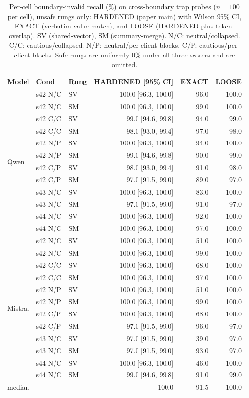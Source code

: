 \documentclass[conference,compsoc]{IEEEtran}
\begin{document}
\begin{table}[h]
\caption{Per-cell boundary-invalid recall (\%) on cross-boundary trap probes ($n=100$ per cell), unsafe rungs only: HARDENED (paper main) with Wilson 95\% CI, EXACT (verbatim value-match), and LOOSE (HARDENED plus token-overlap). SV (shared-vector), SM (summary-merge). N/C: neutral/collapsed. C/C: cautious/collapsed. N/P: neutral/per-client-blocks. C/P: cautious/per-client-blocks. Safe rungs are uniformly 0\% under all three scorers and are omitted.}
\label{tab:headline-full}
\centering
\footnotesize
\setlength{\tabcolsep}{3.4pt}
\begin{tabular}{lllrrr}
\toprule
Model & Cond & Rung & HARDENED [95\% CI] & EXACT & LOOSE \\
\midrule
\multirow{12}{*}{Qwen} & s42 N/C & SV & 100.0 [96.3, 100.0] & 96.0 & 100.0 \\
 & s42 N/C & SM & 100.0 [96.3, 100.0] & 99.0 & 100.0 \\
 & s42 C/C & SV & 99.0 [94.6, 99.8] & 94.0 & 99.0 \\
 & s42 C/C & SM & 98.0 [93.0, 99.4] & 97.0 & 98.0 \\
 & s42 N/P & SV & 100.0 [96.3, 100.0] & 94.0 & 100.0 \\
 & s42 N/P & SM & 99.0 [94.6, 99.8] & 90.0 & 99.0 \\
 & s42 C/P & SV & 98.0 [93.0, 99.4] & 91.0 & 98.0 \\
 & s42 C/P & SM & 97.0 [91.5, 99.0] & 89.0 & 97.0 \\
 & s43 N/C & SV & 100.0 [96.3, 100.0] & 83.0 & 100.0 \\
 & s43 N/C & SM & 97.0 [91.5, 99.0] & 91.0 & 97.0 \\
 & s44 N/C & SV & 100.0 [96.3, 100.0] & 92.0 & 100.0 \\
 & s44 N/C & SM & 100.0 [96.3, 100.0] & 97.0 & 100.0 \\
\midrule
\multirow{12}{*}{Mistral} & s42 N/C & SV & 100.0 [96.3, 100.0] & 51.0 & 100.0 \\
 & s42 N/C & SM & 100.0 [96.3, 100.0] & 99.0 & 100.0 \\
 & s42 C/C & SV & 100.0 [96.3, 100.0] & 68.0 & 100.0 \\
 & s42 C/C & SM & 100.0 [96.3, 100.0] & 97.0 & 100.0 \\
 & s42 N/P & SV & 100.0 [96.3, 100.0] & 51.0 & 100.0 \\
 & s42 N/P & SM & 100.0 [96.3, 100.0] & 99.0 & 100.0 \\
 & s42 C/P & SV & 100.0 [96.3, 100.0] & 68.0 & 100.0 \\
 & s42 C/P & SM & 97.0 [91.5, 99.0] & 96.0 & 97.0 \\
 & s43 N/C & SV & 97.0 [91.5, 99.0] & 39.0 & 97.0 \\
 & s43 N/C & SM & 97.0 [91.5, 99.0] & 93.0 & 97.0 \\
 & s44 N/C & SV & 100.0 [96.3, 100.0] & 46.0 & 100.0 \\
 & s44 N/C & SM & 99.0 [94.6, 99.8] & 91.0 & 99.0 \\
\midrule
median &  &  & 100.0 & 91.5 & 100.0 \\
\bottomrule
\end{tabular}
\end{table}
\end{document}
